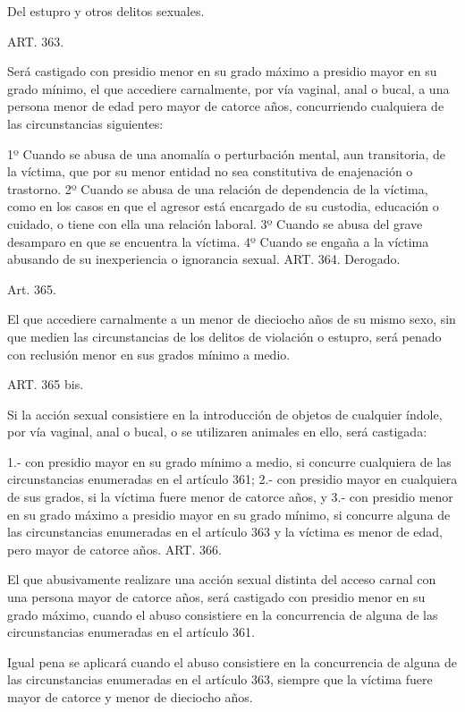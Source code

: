 Del estupro y otros delitos sexuales.


    ART. 363.

    Será castigado con presidio menor en su grado máximo a presidio mayor en su grado mínimo, el que accediere carnalmente, por vía vaginal, anal o bucal, a una persona menor de edad pero mayor de catorce años, concurriendo cualquiera de las circunstancias siguientes:

    1º Cuando se abusa de una anomalía o perturbación mental, aun transitoria, de la víctima, que por su menor entidad no sea constitutiva de enajenación o trastorno.
    2º Cuando se abusa de una relación de dependencia de la víctima, como en los casos en que el agresor está encargado de su custodia, educación o cuidado, o tiene con ella una relación laboral.
    3º Cuando se abusa del grave desamparo en que se encuentra la víctima.
    4º Cuando se engaña a la víctima abusando de su inexperiencia o ignorancia sexual.
    ART. 364.    Derogado.

    Art. 365.

    El que accediere carnalmente a un menor de dieciocho años de su mismo sexo, sin que medien las circunstancias de los delitos de violación o estupro, será penado con reclusión menor en sus grados mínimo a medio.


    ART. 365 bis.

    Si la acción sexual consistiere en la introducción de objetos de cualquier índole, por vía vaginal, anal o bucal, o se utilizaren animales en ello, será castigada:

    1.- con presidio mayor en su grado mínimo a medio, si concurre cualquiera de las circunstancias enumeradas en el artículo 361;
    2.- con presidio mayor en cualquiera de sus grados, si la víctima fuere menor de catorce años, y 3.- con presidio menor en su grado máximo a presidio mayor en su grado mínimo, si concurre alguna de las circunstancias enumeradas en el artículo 363 y la víctima es menor de edad, pero mayor de catorce años.
    ART. 366.

    El que abusivamente realizare una acción sexual distinta del acceso carnal con una persona mayor de catorce años, será castigado con presidio menor en su grado máximo, cuando el abuso consistiere en la concurrencia de alguna de las circunstancias enumeradas en el artículo 361.

    Igual pena se aplicará cuando el abuso consistiere en la concurrencia de alguna de las circunstancias enumeradas en el artículo 363, siempre que la víctima fuere mayor de catorce y menor de dieciocho años.

